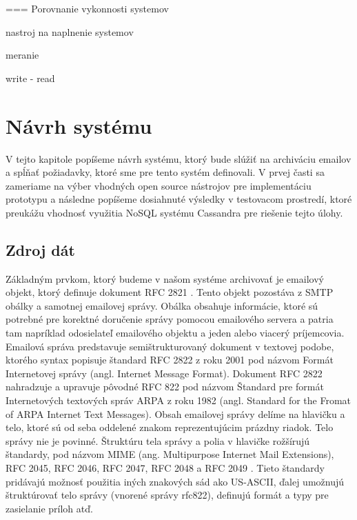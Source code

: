 \documentclass[11pt,twoside,a4paper]{book}
\begin{document}
=== Porovnanie vykonnosti systemov 

nastroj na naplnenie systemov 

meranie 

write - read 




\chapter{Návrh systému}

V tejto kapitole popíšeme návrh systému, ktorý bude slúžiť na archiváciu emailov a spĺňať požiadavky, ktoré sme pre tento systém definovali. V prvej časti sa zameriame na výber vhodných open source nástrojov pre implementáciu prototypu a následne popíšeme dosiahnuté výsledky v testovacom prostredí, ktoré preukážu vhodnosť využitia NoSQL systému Cassandra pre riešenie tejto úlohy.

\section{Zdroj dát}
Základným prvkom, ktorý budeme v našom systéme archivovať je emailový objekt, ktorý definuje dokument RFC 2821 \cite{}. Tento objekt pozostáva z SMTP obálky a samotnej emailovej správy. Obálka obsahuje informácie, ktoré sú potrebné pre korektné doručenie správy pomocou emailového servera a patria tam napríklad odosielateľ emailového objektu a jeden alebo viacerý príjemcovia. Emailová správa predstavuje semištrukturovaný dokument \cite{Udell} v textovej podobe, ktorého syntax popisuje štandard RFC 2822 \cite{Resnick:2001:IMF:RFC2822} z roku 2001 pod názvom Formát Internetovej správy (angl. Internet Message Format). Dokument RFC 2822 nahradzuje a upravuje pôvodné RFC 822 pod názvom Štandard pre formát Internetových textových správ ARPA z roku 1982 (angl. Standard for the Fromat of ARPA Internet Text Messages). Obsah emailovej správy delíme na hlavičku a telo, ktoré sú od seba oddelené znakom reprezentujúcim prázdny riadok. Telo správy nie je povinné. Štruktúru tela správy a polia v hlavičke rožšírujú štandardy, pod názvom MIME (ang. Multipurpose Internet Mail Extensions), RFC 2045, RFC 2046, RFC 2047, RFC 2048 a RFC 2049 \cite{}. Tieto štandardy pridávajú možnosť použitia iných znakových sád ako US-ASCII, ďalej umožnujú štruktúrovať telo správy (vnorené správy rfc822), definujú formát a typy pre zasielanie príloh atď.
\end{document}
